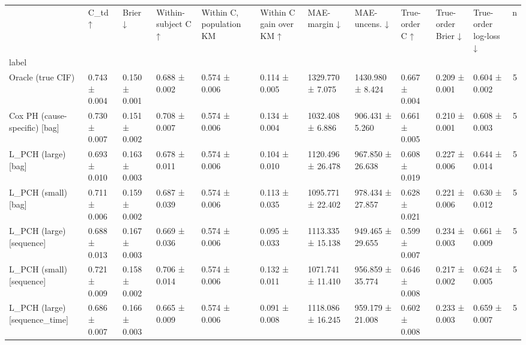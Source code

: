 \begin{tabular}{lllllllllllr}
\toprule
 & C\_td ↑ & Brier ↓ & Within-subject C ↑ & Within C, population KM & Within C gain over KM ↑ & MAE-margin ↓ & MAE-uncens. ↓ & True-order C ↑ & True-order Brier ↓ & True-order log-loss ↓ & n \\
label &  &  &  &  &  &  &  &  &  &  &  \\
\midrule
Oracle (true CIF) & 0.743 ± 0.004 & 0.150 ± 0.001 & 0.688 ± 0.002 & 0.574 ± 0.006 & 0.114 ± 0.005 & 1329.770 ± 7.075 & 1430.980 ± 8.424 & 0.667 ± 0.004 & 0.209 ± 0.001 & 0.604 ± 0.002 & 5 \\
Cox PH (cause-specific) [bag] & 0.730 ± 0.007 & 0.151 ± 0.002 & 0.708 ± 0.007 & 0.574 ± 0.006 & 0.134 ± 0.004 & 1032.408 ± 6.886 & 906.431 ± 5.260 & 0.661 ± 0.005 & 0.210 ± 0.001 & 0.608 ± 0.003 & 5 \\
L\_PCH (large) [bag] & 0.693 ± 0.010 & 0.163 ± 0.003 & 0.678 ± 0.011 & 0.574 ± 0.006 & 0.104 ± 0.010 & 1120.496 ± 26.478 & 967.850 ± 26.638 & 0.608 ± 0.019 & 0.227 ± 0.006 & 0.644 ± 0.014 & 5 \\
L\_PCH (small) [bag] & 0.711 ± 0.006 & 0.159 ± 0.002 & 0.687 ± 0.039 & 0.574 ± 0.006 & 0.113 ± 0.035 & 1095.771 ± 22.402 & 978.434 ± 27.857 & 0.628 ± 0.021 & 0.221 ± 0.006 & 0.630 ± 0.012 & 5 \\
L\_PCH (large) [sequence] & 0.688 ± 0.013 & 0.167 ± 0.003 & 0.669 ± 0.036 & 0.574 ± 0.006 & 0.095 ± 0.033 & 1113.335 ± 15.138 & 949.465 ± 29.655 & 0.599 ± 0.007 & 0.234 ± 0.003 & 0.661 ± 0.009 & 5 \\
L\_PCH (small) [sequence] & 0.721 ± 0.009 & 0.158 ± 0.002 & 0.706 ± 0.014 & 0.574 ± 0.006 & 0.132 ± 0.011 & 1071.741 ± 11.410 & 956.859 ± 35.774 & 0.646 ± 0.008 & 0.217 ± 0.002 & 0.624 ± 0.005 & 5 \\
L\_PCH (large) [sequence\_time] & 0.686 ± 0.007 & 0.166 ± 0.003 & 0.665 ± 0.009 & 0.574 ± 0.006 & 0.091 ± 0.008 & 1118.086 ± 16.245 & 959.179 ± 21.008 & 0.602 ± 0.008 & 0.233 ± 0.003 & 0.659 ± 0.007 & 5 \\
\bottomrule
\end{tabular}
